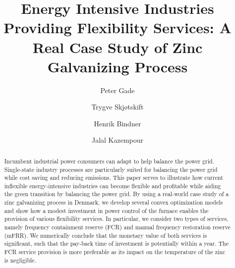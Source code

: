 \documentclass[sigconf]{acmart}
\begin{document}
\title{Energy Intensive Industries Providing Flexibility Services: A Real Case Study of Zinc Galvanizing Process}


\author{Peter Gade}

\author{Trygve Skj{\o}tskift}

\author{Henrik Bindner}

\author{Jalal Kazempour}

\renewcommand{\shortauthors}{Gade et al.}

\begin{abstract}
    Incumbent industrial power consumers can adapt to help balance the power grid. Single-state industry processes are particularly suited for balancing the power grid while cost saving and reducing emissions. This paper serves to illustrate how current inflexible energy-intensive industries can become flexible and profitable while aiding the green transition by balancing the power grid. By using a real-world case study of a zinc galvanizing process in Denmark, we develop several convex optimization models and show how a modest investment in power control of the furnace enables the provision of various flexibility services. In particular, we consider two types of services, namely frequency containment reserve (FCR) and manual frequency restoration reserve (mFRR). We numerically conclude that the monetary value of both services is significant, such that the pay-back time of investment is potentially within a year. The FCR service provision is more preferable as its impact on the temperature of the zinc is negligible. 
\end{abstract}
\end{document}
